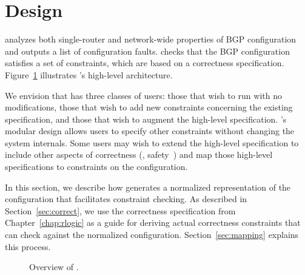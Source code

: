 \section{\rcc Design}
\label{sec:rcc_overview}

\rcc analyzes both single-router and network-wide properties of BGP
configuration and outputs a list of configuration faults.  \rcc checks
that the BGP configuration satisfies a set of constraints, which are
based on a correctness specification.  Figure~\ref{fig:rcc_arch}
illustrates \rccns's high-level architecture.

We envision that \rcc has three classes of users: 
those that wish to run \rcc with no modifications, 
those that wish to add new constraints concerning the existing
specification, 
and
those that wish to augment the high-level specification.
\rccns's modular design allows users to specify
other constraints without changing the system internals.
Some users may wish to extend the high-level specification to include other
aspects of correctness (\eg, safety~\cite{Griffin2002}) and map those
high-level specifications to constraints on the configuration.

%
In this section, we describe how \rcc generates a normalized
representation of the configuration that facilitates constraint
checking.
%
As described in Section~\ref{sec:correct}, we use the correctness
specification from Chapter~\ref{chap:rlogic} as a guide for deriving
actual correctness constraints that \rcc can check against the
normalized configuration.  Section~\ref{sec:mapping} explains this
process.




\begin{figure}[t]
\centering{}
\caption{Overview of \rccns.}
\label{fig:rcc_arch}
\end{figure}



